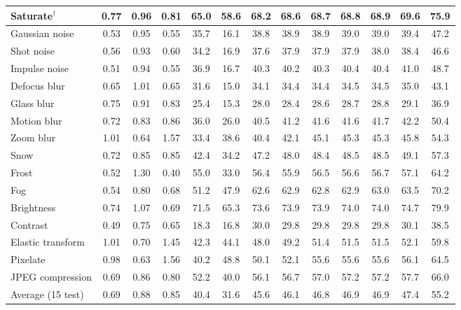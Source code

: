 \begin{table}[t]
\begin{tabular}{l|ccc|cc|cc|ccccc}
        Saturate$^\dagger$ & 0.77 & 0.96 & 0.81 & 65.0 & 58.6 & 68.2 & 68.6 & 68.7 & 68.8 & 68.9 & 69.6 & 75.9 \\
        \midrule
        Gaussian noise & 0.53 & 0.95 & 0.55 & 35.7 & 16.1 & 38.8 & 38.9 & 38.9 & 39.0 & 39.0 & 39.4 & 47.2 \\
        Shot noise & 0.56 & 0.93 & 0.60 & 34.2 & 16.9 & 37.6 & 37.9 & 37.9 & 37.9 & 38.0 & 38.4 & 46.6 \\
        Impulse noise & 0.51 & 0.94 & 0.55 & 36.9 & 16.7 & 40.3 & 40.2 & 40.3 & 40.4 & 40.4 & 41.0 & 48.7 \\
        Defocus blur & 0.65 & 1.01 & 0.65 & 31.6 & 15.0 & 34.1 & 34.4 & 34.4 & 34.5 & 34.5 & 35.0 & 43.1 \\
        Glass blur & 0.75 & 0.91 & 0.83 & 25.4 & 15.3 & 28.0 & 28.4 & 28.6 & 28.7 & 28.8 & 29.1 & 36.9 \\
        Motion blur & 0.72 & 0.83 & 0.86 & 36.0 & 26.0 & 40.5 & 41.2 & 41.6 & 41.6 & 41.7 & 42.2 & 50.4 \\
        Zoom blur & 1.01 & 0.64 & 1.57 & 33.4 & 38.6 & 40.4 & 42.1 & 45.1 & 45.3 & 45.3 & 45.8 & 54.3 \\
        Snow & 0.72 & 0.85 & 0.85 & 42.4 & 34.2 & 47.2 & 48.0 & 48.4 & 48.5 & 48.5 & 49.1 & 57.3 \\
        Frost & 0.52 & 1.30 & 0.40 & 55.0 & 33.0 & 56.4 & 55.9 & 56.5 & 56.6 & 56.7 & 57.1 & 64.2 \\
        Fog & 0.54 & 0.80 & 0.68 & 51.2 & 47.9 & 62.6 & 62.9 & 62.8 & 62.9 & 63.0 & 63.5 & 70.2 \\
        Brightness & 0.74 & 1.07 & 0.69 & 71.5 & 65.3 & 73.6 & 73.9 & 73.9 & 74.0 & 74.0 & 74.7 & 79.9 \\
        Contrast & 0.49 & 0.75 & 0.65 & 18.3 & 16.8 & 30.0 & 29.8 & 29.8 & 29.8 & 29.8 & 30.1 & 38.5 \\
        Elastic transform & 1.01 & 0.70 & 1.45 & 42.3 & 44.1 & 48.0 & 49.2 & 51.4 & 51.5 & 51.5 & 52.1 & 59.8 \\
        Pixelate & 0.98 & 0.63 & 1.56 & 40.2 & 48.8 & 50.1 & 52.1 & 55.6 & 55.6 & 55.6 & 56.1 & 64.5 \\
        JPEG compression & 0.69 & 0.86 & 0.80 & 52.2 & 40.0 & 56.1 & 56.7 & 57.0 & 57.2 & 57.2 & 57.7 & 66.0 \\
        \midrule
        Average (15 test) & 0.69 & 0.88 & 0.85 & 40.4 & 31.6 & 45.6 & 46.1 & 46.8 & 46.9 & 46.9 & 47.4 & 55.2 \\
        \bottomrule
    \end{tabular}
\end{table}
